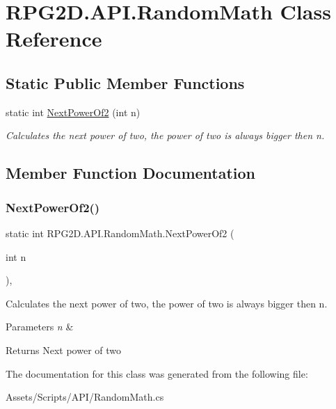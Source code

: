 \hypertarget{class_r_p_g2_d_1_1_a_p_i_1_1_random_math}{}\section{R\+P\+G2\+D.\+A\+P\+I.\+Random\+Math Class Reference}
\label{class_r_p_g2_d_1_1_a_p_i_1_1_random_math}
\subsection*{Static Public Member Functions}
\begin{DoxyCompactItemize}
\item 
static int \mbox{\hyperlink{class_r_p_g2_d_1_1_a_p_i_1_1_random_math_a829a5e50051acd046afc856e3ca63981}{Next\+Power\+Of2}} (int n)
\begin{DoxyCompactList}\small\item\em Calculates the next power of two, the power of two is always bigger then n. \end{DoxyCompactList}\end{DoxyCompactItemize}


\subsection{Member Function Documentation}
\mbox{\label{class_r_p_g2_d_1_1_a_p_i_1_1_random_math_a829a5e50051acd046afc856e3ca63981}} 
\subsubsection{\texorpdfstring{Next\+Power\+Of2()}{NextPowerOf2()}}
{\footnotesize\ttfamily static int R\+P\+G2\+D.\+A\+P\+I.\+Random\+Math.\+Next\+Power\+Of2 (\begin{DoxyParamCaption}\item[{int}]{n }\end{DoxyParamCaption})\hspace{0.3cm}{\ttfamily [inline]}, {\ttfamily [static]}}



Calculates the next power of two, the power of two is always bigger then n. 


\begin{DoxyParams}{Parameters}
{\em n} & \\
\hline
\end{DoxyParams}
\begin{DoxyReturn}{Returns}
Next power of two
\end{DoxyReturn}


The documentation for this class was generated from the following file\+:\begin{DoxyCompactItemize}
\item 
Assets/\+Scripts/\+A\+P\+I/Random\+Math.\+cs\end{DoxyCompactItemize}
